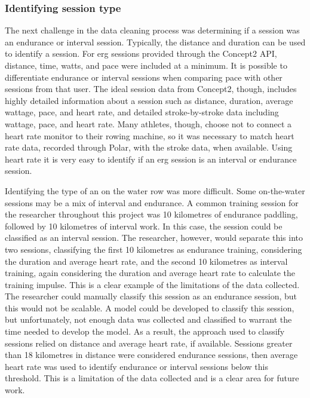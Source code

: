 \subsubsection{Identifying session type}
The next challenge in the data cleaning process was determining if a session was an endurance or interval session. Typically, the distance and duration can be used to identify a session. For erg sessions provided through the Concept2 API, distance, time, watts, and pace were included at a minimum. It is possible to differentiate endurance or interval sessions when comparing pace with other sessions from that user. The ideal session data from Concept2, though, includes highly detailed information about a session such as distance, duration, average wattage, pace, and heart rate, and detailed stroke-by-stroke data including wattage, pace, and heart rate. Many athletes, though, choose not to connect a heart rate monitor to their rowing machine, so it was necessary to match heart rate data, recorded through Polar, with the stroke data, when available. Using heart rate it is very easy to identify if an erg session is an interval or endurance session.

Identifying the type of an on the water row was more difficult. Some on-the-water sessions may be a mix of interval and endurance. A common training session for the researcher throughout this project was 10 kilometres of endurance paddling, followed by 10 kilometres of interval work. In this case, the session could be classified as an interval session. The researcher, however, would separate this into two sessions, classifying the first 10 kilometres as endurance training, considering the duration and average heart rate, and the second 10 kilometres as interval training, again considering the duration and average heart rate to calculate the training impulse. This is a clear example of the limitations of the data collected. The researcher could manually classify this session as an endurance session, but this would not be scalable. A model could be developed to classify this session, but unfortunately, not enough data was collected and classified to warrant the time needed to develop the model. As a result, the approach used to classify sessions relied on distance and average heart rate, if available. Sessions greater than 18 kilometres in distance were considered endurance sessions, then average heart rate was used to identify endurance or interval sessions below this threshold. This is a limitation of the data collected and is a clear area for future work.

